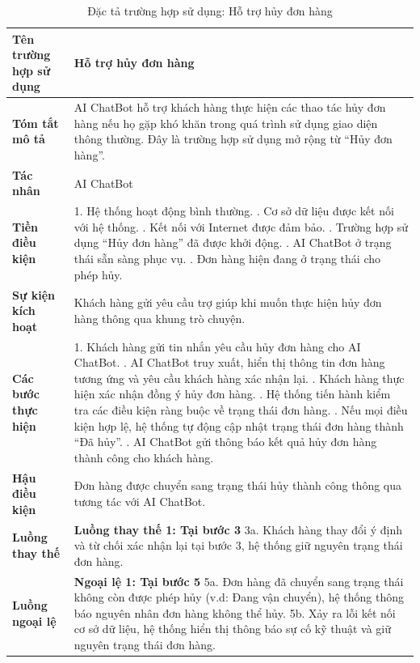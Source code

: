{
\begin{longtable}{|>{\bfseries}p{4cm}|p{11.5cm}|}
\caption{Đặc tả trường hợp sử dụng: Hỗ trợ hủy đơn hàng}
\label{tab:uc-chatbot-cancel-support} \\
\hline
\textbf{Tên trường hợp sử dụng} & Hỗ trợ hủy đơn hàng \\
\hline
\textbf{Tóm tắt mô tả} & AI ChatBot hỗ trợ khách hàng thực hiện các thao tác hủy đơn hàng nếu họ gặp khó khăn trong quá trình sử dụng giao diện thông thường. Đây là trường hợp sử dụng mở rộng từ “Hủy đơn hàng”. \\
\hline
\textbf{Tác nhân} & AI ChatBot \\
\hline
\textbf{Tiền điều kiện} & 1. Hệ thống hoạt động bình thường. \newline
2. Cơ sở dữ liệu được kết nối với hệ thống. \newline
3. Kết nối với Internet được đảm bảo. \newline
4. Trường hợp sử dụng “Hủy đơn hàng” đã được khởi động. \newline
5. AI ChatBot ở trạng thái sẵn sàng phục vụ. \newline
6. Đơn hàng hiện đang ở trạng thái cho phép hủy. \\
\hline
\textbf{Sự kiện kích hoạt} & Khách hàng gửi yêu cầu trợ giúp khi muốn thực hiện hủy đơn hàng thông qua khung trò chuyện. \\
\hline
\textbf{Các bước thực hiện} & 1. Khách hàng gửi tin nhắn yêu cầu hủy đơn hàng cho AI ChatBot. \newline
2. AI ChatBot truy xuất, hiển thị thông tin đơn hàng tương ứng và yêu cầu khách hàng xác nhận lại. \newline
3. Khách hàng thực hiện xác nhận đồng ý hủy đơn hàng. \newline
4. Hệ thống tiến hành kiểm tra các điều kiện ràng buộc về trạng thái đơn hàng. \newline
5. Nếu mọi điều kiện hợp lệ, hệ thống tự động cập nhật trạng thái đơn hàng thành “Đã hủy”. \newline
6. AI ChatBot gửi thông báo kết quả hủy đơn hàng thành công cho khách hàng. \\
\hline
\textbf{Hậu điều kiện} & Đơn hàng được chuyển sang trạng thái hủy thành công thông qua tương tác với AI ChatBot. \\
\hline
\textbf{Luồng thay thế} & \textbf{Luồng thay thế 1: Tại bước 3} \newline
3a. Khách hàng thay đổi ý định và từ chối xác nhận lại tại bước 3, hệ thống giữ nguyên trạng thái đơn hàng. \\
\hline
\textbf{Luồng ngoại lệ} & \textbf{Ngoại lệ 1: Tại bước 5} \newline
5a. Đơn hàng đã chuyển sang trạng thái không còn được phép hủy (v.d: Đang vận chuyển), hệ thống thông báo nguyên nhân đơn hàng không thể hủy. \newline
5b. Xảy ra lỗi kết nối cơ sở dữ liệu, hệ thống hiển thị thông báo sự cố kỹ thuật và giữ nguyên trạng thái đơn hàng. \\
\hline
\end{longtable}

}
